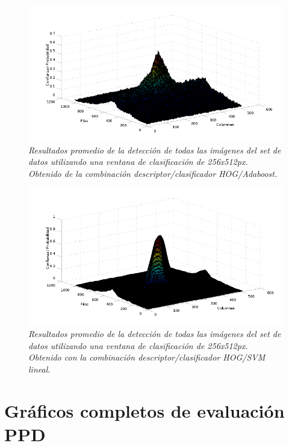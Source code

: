 \begin{figure}[htc]
  \centering
  \includegraphics[scale=.6]{images/mean/boost/256}
  \caption{\em  Resultados promedio de la detección de todas las imágenes del set de datos utilizando una ventana de clasificación de 256x512px. Obtenido de la combinación descriptor/clasificador HOG/Adaboost.}  
  \label{fig:gp7}
\end{figure}

\begin{figure}[htc]
  \centering
  \includegraphics[scale=.6]{images/mean/svm/256}
  \caption{\em  Resultados promedio de la detección de todas las imágenes del set de datos utilizando una ventana de clasificación de 256x512px. Obtenido con la combinación descriptor/clasificador HOG/SVM lineal.}  
  \label{fig:gp8}
\end{figure}


\section{Gráficos completos de evaluación PPD}

